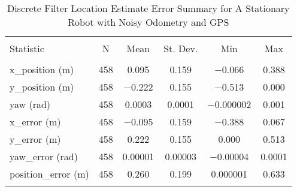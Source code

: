 
\begin{table}[htbp] \centering 
  \caption{Discrete Filter Location Estimate Error Summary for A Stationary Robot with Noisy Odometry and GPS} 
  \label{tab:one_stationary_discrete_summary} 
\begin{tabular}{@{\extracolsep{5pt}}lccccc} 
\\[-1.8ex]\hline 
\hline \\[-1.8ex] 
Statistic & \multicolumn{1}{c}{N} & \multicolumn{1}{c}{Mean} & \multicolumn{1}{c}{St. Dev.} & \multicolumn{1}{c}{Min} & \multicolumn{1}{c}{Max} \\ 
\hline \\[-1.8ex] 
x\_position (m) & 458 & \num{0.095} & \num{0.159} & $-$0.066 & \num{0.388} \\ 
y\_position (m) & 458 & $-$0.222 & \num{0.155} & $-$0.513 & \num{0.000} \\ 
yaw (rad) & 458 & \num{0.0003} & \num{0.0001} & $-$0.000002 & \num{0.001} \\ 
x\_error (m) & 458 & $-$0.095 & \num{0.159} & $-$0.388 & \num{0.067} \\ 
y\_error (m) & 458 & \num{0.222} & \num{0.155} & \num{0.000} & \num{0.513} \\
yaw\_error (rad) & 458 & \num{0.00001} & \num{0.00003} & $-$0.00004 & \num{0.0001} \\ 
position\_error (m) & 458 & \num{0.260} & \num{0.199} & \num{0.000001} & \num{0.633} \\ 

\hline \\[-1.8ex] 
\end{tabular} 
\end{table} 
